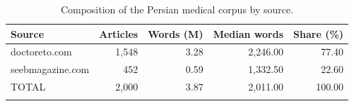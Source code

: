\begin{table}[h]
\caption{Composition of the Persian medical corpus by source.}\label{tab:corpus_sources}
\begin{tabular}{@{}lrrrr@{}}
\toprule
Source & Articles & Words (M) & Median words & Share (\%) \\
\midrule
doctoreto.com & 1,548 & 3.28 & 2,246.00 & 77.40 \\
seebmagazine.com & 452 & 0.59 & 1,332.50 & 22.60 \\
TOTAL & 2,000 & 3.87 & 2,011.00 & 100.00 \\
\botrule
\end{tabular}
\end{table}
